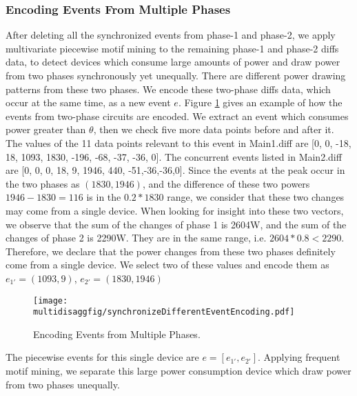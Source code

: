 \subsubsection{Encoding Events From Multiple Phases}
After deleting all the synchronized events from phase-1 and phase-2, 
we apply multivariate piecewise motif mining to the remaining phase-1 and phase-2 diffs data, 
to detect devices which consume large amounts of power 
and draw power from two phases synchronously yet unequally. 
There are different power drawing patterns from these two phases.  
We encode these two-phase diffs data, which occur at the same time, as a new event $e$. 
Figure \ref{fig_eventEncoding} gives an example of how the events from two-phase circuits
are encoded. 
We extract an event which consumes power greater than $\theta$, 
then we check five more data points before and after it. 
The values of the 11 data points relevant to this event in Main1.diff are [0, 0, -18, 18, 1093, 1830, -196, -68, -37, -36, 0]. 
The concurrent events listed in Main2.diff are [0, 0, 0, 18, 9, 1946, 440, -51,-36,-36,0]. 
Since the events at the peak occur in the two phases as $(1830, 1946)$, 
and the difference of these two powers $1946-1830=116$ is in the $0.2*1830$ range, 
we consider that these two changes may come from a single device. 
When looking for insight into these two vectors, 
we observe that the sum of the changes of phase 1 is 2604W, and the sum of the changes of phase 2 is 2290W. 
They are in the same range, i.e. $2604*0.8 < 2290$. 
Therefore, we declare that the power changes from these two phases definitely come from a single device. 
We select two of these values and encode them as $e_{1'}=(1093, 9)$, $e_{2'}= (1830, 1946)$
\begin{figure}[h]
\centering
\texttt{[image: multidisaggfig/synchronizeDifferentEventEncoding.pdf]}
\caption{Encoding Events from Multiple Phases.}
\label{fig_eventEncoding}
\end{figure}

The piecewise events for this single device are $e= [e_{1'}, e_{2'}]$. 
Applying frequent motif mining, 
we separate this large power consumption device which draw power from two phases unequally. 




